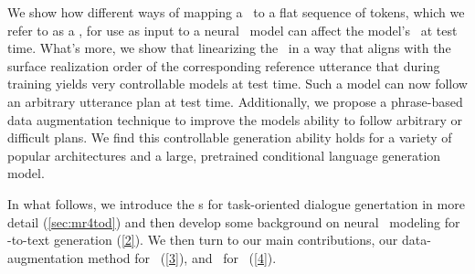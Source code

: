 We show how different ways of mapping a \meaningrepresentation~to a flat sequence of tokens, which we refer to as a \linearizationstrategies,
for use as input to a neural \sequencetosequence~model can affect
the model's \faithfulness~at test time.
What's more, we show  that
linearizing the \meaningrepresentation~in a way that aligns with the surface
realization order of the corresponding reference utterance that during training  yields very 
controllable models at test time. Such a model can now follow an arbitrary
utterance plan at test time. Additionally, we propose a phrase-based data augmentation
technique to improve the models ability to follow arbitrary or difficult plans. We find
this controllable generation ability holds for a variety of popular architectures and a large, pretrained conditional language generation model.


%
%
In what follows, we introduce the \meaningrepresentation s for task-oriented
dialogue genertation in more detail (\autoref{sec:mr4tod}) and then develop some
background on neural \sequencetosequence~modeling for 
\meaningrepresentation-to-text generation (\autoref{2}). We then turn
to our main contributions,
our data-augmentation method for \faithfulgeneration~(\autoref{3}),
and \linearizationstrategies~for \controllablegeneration~(\autoref{4}).

